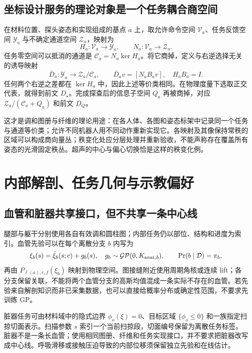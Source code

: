 \documentclass[11pt,a4paper]{article}
\numberwithin{equation}{section}
\theoremstyle{definition}
\begin{document}
\subsection{坐标设计服务的理论对象是一个任务耦合商空间}
在材料位置、探头姿态和实现组成的基点 $a$ 上，取允许命令空间 $\mathcal V_a$、任务反馈空间 $\mathcal Y_a$ 与不确定通道空间 $\mathcal Z_a$，映射为
\begin{equation}
 H_a:\mathcal V_a\longrightarrow\mathcal Y_a,\qquad
 N_a:\mathcal V_a\longrightarrow\mathcal Z_a.
\end{equation}
任务零空间可以抵消的通道是 $\mathcal C_a=N_a\ker H_a$。将它商掉，定义与右逆选择无关的诱导映射
\begin{equation}
 \overline D_a:\mathcal Y_a\longrightarrow\mathcal Z_a/\mathcal C_a,
 \qquad \overline D_av=[N_aB_av],\quad H_aB_a=I.
\end{equation}
任何两个右逆之差都在 $\ker H_a$ 中，因此上述等价类相同。在物理度量下选取正交代表，就得到前文 $D_\star$。完成探查后的信息子空间 $Q_a$ 再被商掉，对应 $\mathcal Z_a/(\mathcal C_a+Q_a)$ 和前文 $D_Q$。

这才是调和图册与纤维的理论用途：在各人体、各图和姿态标架中记录同一个任务与通道等价类；允许不同机器人用不同动作重新实现它。各映射及其像保持常秩的区域可以构成商向量丛；秩变化处应分层处理并重新验收，不能声称存在覆盖所有姿态的光滑固定秩丛。超声的中心与偏心切换恰是这样的秩变化例。



\section{内部解剖、任务几何与示教偏好}
\label{sec:v43:anatomy-rules}
\subsection{血管和脏器共享接口，但不共享一条中心线}
腿部与躯干分别使用各自有效调和圆柱图；内部任务仍以部位、结构和进度为索引。血管先验可以在每个离散分支 $b$ 内写为
\begin{equation}
 \xi_b(s)=\bar\xi_b(s;c)+g_b(s),\quad
 g_b\sim\mathcal{GP}(0,K_{{\rm anat},b}),\qquad
 \Pr(b\mid\mathcal D)=\pi_b,
\end{equation}
再由 $P_{\ell(a),c,f}(\xi_b)$ 映射到物理空间。图接缝附近使用周期角核或连续 lift；各分支保留关联，不能将两个血管分支的高斯均值混成一条实际不存在的血管。若先验来自解剖知识而非已采集数据，也可以直接给概率分布或确定性范围，不要求先训练 GP。

脏器任务可由材料域中的隐式边界 $\phi_o(\xi)=0$、目标区域 $\{\phi_o\le0\}$ 和一族指定扫掠切面表示。扫描参数 $s$ 索引一个当前扫掠段，切面编号保留为离散任务标签。脏器不是一条长血管；使用相同图册、纤维和任务实现接口，并不要求把脏器改写成中心线。呼吸滑移或接触压迫导致的内部位移须保留独立先验和在线估计。
\end{document}
